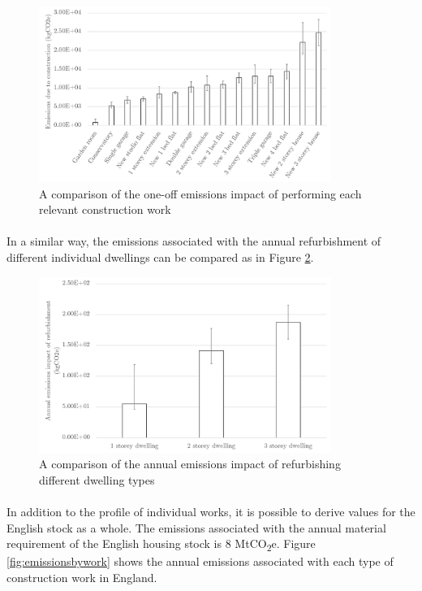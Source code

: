 \documentclass[12pt]{article}
\begin{document}
\begin{figure}[ht!]
    \centering
    \includegraphics[width=0.85\textwidth]{Figures/Ind_works.png}
    \caption{A comparison of the one-off emissions impact of performing each relevant construction work}
    \label{fig:workssummary}
\end{figure}

\paragraph{}
In a similar way, the emissions associated with the annual refurbishment of different individual dwellings can be compared as in Figure \ref{fig:refurbcomp}.

\begin{figure}[!ht]
    \centering
    \includegraphics[width=0.85\textwidth]{Figures/Ind_refurb.png}
    \caption{A comparison of the annual emissions impact of refurbishing different dwelling types}
    \label{fig:refurbcomp}
\end{figure}

\paragraph{}
In addition to the profile of individual works, it is possible to derive values for the English stock as a whole. The emissions associated with the annual material requirement of the English housing stock is 8 MtCO\textsubscript{2}e. Figure \ref{fig:emissionsbywork} shows the annual emissions associated with each type of construction work in England. 
\end{document}
